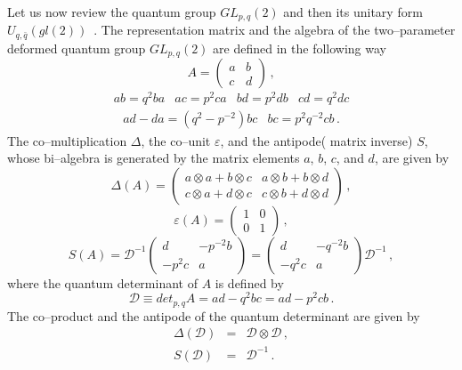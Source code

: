 \documentclass[a4paper,12pt]{article}
\numberwithin{equation}{section}
\begin{document}
Let us now review the quantum group $GL_{p,q}\left(2\right)$ and then its unitary form $U_{q,\bar q}
 \left( gl \left( 2 \right) \right)$~\cite{Jag}.
The representation matrix and the algebra of the two--parameter
 deformed quantum group $GL_{p,q}\left(2\right)$ are defined in
 the following way~\cite{Zum,Dob}
\begin{equation}
A = \left(
\begin{array}{cc}
a & b\\
c & d
\end{array}
\right) \, ,
\end{equation}
\[
\begin{array}{cccc}
ab=q^2ba & ac=p^2ca & bd=p^2db & cd=q^2dc
\end{array}
\]
\begin{equation}\label{commpq}
\begin{array}{cc}
ad-da=\left(q^2-p^{-2}\right)bc & bc = p^2 q^{-2} cb \, .
\end{array}
\end{equation}
The co--multiplication $\Delta$, the co--unit $\varepsilon$,
 and the antipode( matrix inverse) $S$,
 whose bi--algebra is generated by the matrix elements $a$, $b$, $c$,
 and $d$, are given by
\begin{equation}
\Delta \left( A \right) = \left(
\begin{array}{cc}
  a \otimes a + b \otimes c & a \otimes b + b \otimes d \\
  c \otimes a + d \otimes c & c \otimes b + d \otimes d
\end{array}
\right) \, ,
\end{equation}
\begin{equation}
\varepsilon \left( A \right) = \left(
\begin{array}{cc}
 1 & 0 \\
 0 & 1
\end{array}
\right) \, ,
\end{equation}
\begin{equation}
S \left( A \right) =
\mathcal{D}^{-1} \left(
\begin{array}{cc}
d & - p^{-2} b\\
-p^2 c & a
\end{array}
\right) = \left(
\begin{array}{cc}
d & -q^{-2} b \\
-q^2 c & a
\end{array}
\right) \mathcal{D}^{-1} \, ,
\end{equation}
where the quantum determinant of $A$ is defined by
\begin{equation}\label{detq}
\mathcal{D} \equiv det_{p,q} A = ad - q^2 bc = ad - p^2 cb \, .
\end{equation}
The co--product and the antipode of the quantum determinant are given by
\begin{eqnarray}
\Delta \left( \mathcal{D} \right) &=& \mathcal{D} \otimes \mathcal{D} \label{DD} \, , \\
S \left(\mathcal{D} \right) &=& \mathcal{D}^{-1} \label{SD} \, .
\end{eqnarray}
\end{document}
